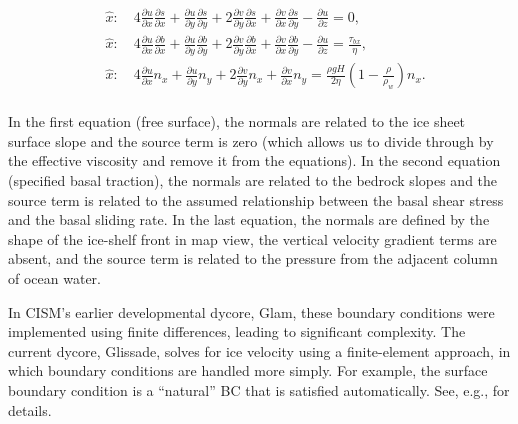 \begin{equation}
\begin{split}
  & \hat{x}:\quad 4\frac{\partial u}{\partial x}\frac{\partial s}{\partial x}+ \frac{\partial u}{\partial y}\frac{\partial s}{\partial y}+2 \frac{\partial v}{\partial y}\frac{\partial s}{\partial x}+\frac{\partial v}{\partial x}\frac{\partial s}{\partial y}-\frac{\partial u}{\partial z}=0, \\ 
  & \hat{x}:\quad 4\frac{\partial u}{\partial x}\frac{\partial b}{\partial x}+\frac{\partial u}{\partial y}\frac{\partial b}{\partial y}+2\frac{\partial v}{\partial y}\frac{\partial b}{\partial x}+\frac{\partial v}{\partial x}\frac{\partial b}{\partial y}-\frac{\partial u}{\partial z}=\frac{\tau _{bx}}{\eta }, \\ 
  & \hat{x}:\quad 4\frac{\partial u}{\partial x}n_{x}+\frac{\partial u}{\partial y}n_{y}+2\frac{\partial v}{\partial y}n_{x}+\frac{\partial v}{\partial x}n_{y}=\frac{\rho gH}{2\eta }\left( 1-\frac{\rho }{\rho _{w}} \right)n_{x}. \\
\end{split}
\end{equation}

\noindent
In the first equation (free surface), the normals are related to the ice sheet surface slope and the source term is zero (which allows us to divide through by the effective viscosity and remove it from the equations). In the second equation (specified basal traction), the normals are related to the bedrock slopes and the source term is related to the assumed relationship between the basal shear stress and the basal sliding rate. In the last equation, the normals are defined by the shape of the ice-shelf front in map view, the vertical velocity gradient terms are absent, and the source term is related to the pressure from the adjacent column of ocean water.

In CISM's earlier developmental dycore, Glam, these boundary conditions were implemented using finite differences, leading to significant complexity.
The current dycore, Glissade, solves for ice velocity using a finite-element approach, in which boundary conditions are handled more simply.
For example, the surface boundary condition is a  ``natural'' BC that is satisfied automatically.  See, e.g., \citet{DUKOWICZ:2010wb} for details.

